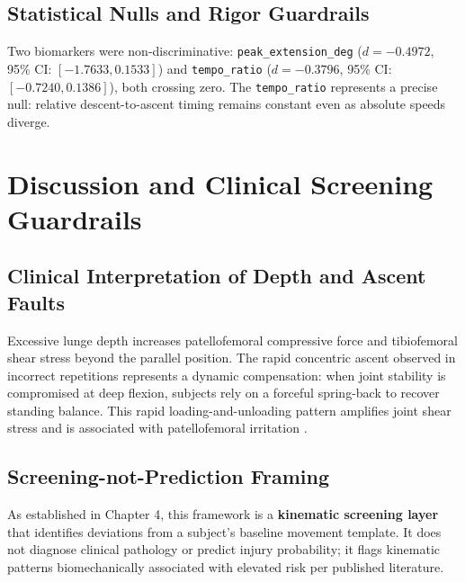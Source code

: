 \subsection{Statistical Nulls and Rigor Guardrails}
\label{sec:5-3-3-statistical-nulls-and-rigor-guardrails}

Two biomarkers were non-discriminative: \texttt{peak\_extension\_deg} ($d = -0.4972$, 95\% CI: $[-1.7633, 0.1533]$) and \texttt{tempo\_ratio} ($d = -0.3796$, 95\% CI: $[-0.7240, 0.1386]$), both crossing zero. The \texttt{tempo\_ratio} represents a precise null: relative descent-to-ascent timing remains constant even as absolute speeds diverge.



\section{Discussion and Clinical Screening Guardrails}
\label{sec:5-4-discussion-and-clinical-screening-guardrails}


\subsection{Clinical Interpretation of Depth and Ascent Faults}
\label{sec:5-4-1-clinical-interpretation-of-depth-and-ascent-faults}

Excessive lunge depth increases patellofemoral compressive force and tibiofemoral shear stress beyond the parallel position. The rapid concentric ascent observed in incorrect repetitions represents a dynamic compensation: when joint stability is compromised at deep flexion, subjects rely on a forceful spring-back to recover standing balance. This rapid loading-and-unloading pattern amplifies joint shear stress and is associated with patellofemoral irritation \citep{Powers_2003}.

\subsection{Screening-not-Prediction Framing}
\label{sec:5-4-2-screening-not-prediction-framing}

As established in Chapter 4, this framework is a \textbf{kinematic screening layer} that identifies deviations from a subject's baseline movement template. It does not diagnose clinical pathology or predict injury probability; it flags kinematic patterns biomechanically associated with elevated risk per published literature.



